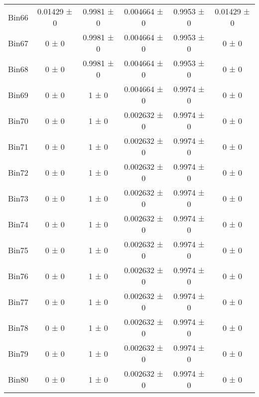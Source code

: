 \begin{tabular}{@{\extracolsep{4pt}}lccccc@{}}
     Bin66 & 0.01429 ± 0 & 0.9981 ± 0 & 0.004664 ± 0 & 0.9953 ± 0 & 0.01429 ± 0 \\ 
     Bin67 & 0 ± 0 & 0.9981 ± 0 & 0.004664 ± 0 & 0.9953 ± 0 & 0 ± 0 \\ 
     Bin68 & 0 ± 0 & 0.9981 ± 0 & 0.004664 ± 0 & 0.9953 ± 0 & 0 ± 0 \\ 
     Bin69 & 0 ± 0 & 1 ± 0 & 0.004664 ± 0 & 0.9974 ± 0 & 0 ± 0 \\ 
     Bin70 & 0 ± 0 & 1 ± 0 & 0.002632 ± 0 & 0.9974 ± 0 & 0 ± 0 \\ 
     Bin71 & 0 ± 0 & 1 ± 0 & 0.002632 ± 0 & 0.9974 ± 0 & 0 ± 0 \\ 
     Bin72 & 0 ± 0 & 1 ± 0 & 0.002632 ± 0 & 0.9974 ± 0 & 0 ± 0 \\ 
     Bin73 & 0 ± 0 & 1 ± 0 & 0.002632 ± 0 & 0.9974 ± 0 & 0 ± 0 \\ 
     Bin74 & 0 ± 0 & 1 ± 0 & 0.002632 ± 0 & 0.9974 ± 0 & 0 ± 0 \\ 
     Bin75 & 0 ± 0 & 1 ± 0 & 0.002632 ± 0 & 0.9974 ± 0 & 0 ± 0 \\ 
     Bin76 & 0 ± 0 & 1 ± 0 & 0.002632 ± 0 & 0.9974 ± 0 & 0 ± 0 \\ 
     Bin77 & 0 ± 0 & 1 ± 0 & 0.002632 ± 0 & 0.9974 ± 0 & 0 ± 0 \\ 
     Bin78 & 0 ± 0 & 1 ± 0 & 0.002632 ± 0 & 0.9974 ± 0 & 0 ± 0 \\ 
     Bin79 & 0 ± 0 & 1 ± 0 & 0.002632 ± 0 & 0.9974 ± 0 & 0 ± 0 \\ 
     Bin80 & 0 ± 0 & 1 ± 0 & 0.002632 ± 0 & 0.9974 ± 0 & 0 ± 0 \\ 
\hline\hline
  \end{tabular}
